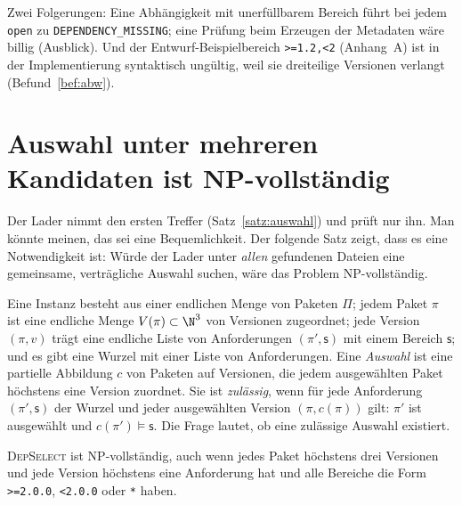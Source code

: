 Zwei Folgerungen: Eine Abhängigkeit mit unerfüllbarem Bereich führt bei jedem \texttt{open} zu \texttt{DEPENDENCY\_MISSING}; eine Prüfung beim Erzeugen der Metadaten wäre billig (Ausblick). Und der Entwurf-Beispielbereich \texttt{>=1.2,<2} (Anhang~A) ist in der Implementierung syntaktisch ungültig, weil sie dreiteilige Versionen verlangt (Befund~\ref{bef:abw}).

\section{Auswahl unter mehreren Kandidaten ist NP-vollständig}

Der Lader nimmt den ersten Treffer (Satz~\ref{satz:auswahl}) und prüft nur ihn. Man könnte meinen, das sei eine Bequemlichkeit. Der folgende Satz zeigt, dass es eine Notwendigkeit ist: Würde der Lader unter \emph{allen} gefundenen Dateien eine gemeinsame, verträgliche Auswahl suchen, wäre das Problem NP-vollständig.

\begin{definition}
	\label{def:depselect}
	Eine Instanz besteht aus einer endlichen Menge von Paketen $\Pi$; jedem Paket $\pi$ ist eine endliche Menge $V(\pi)\subset\N^3$ von Versionen zugeordnet; jede Version $(\pi,v)$ trägt eine endliche Liste von Anforderungen $(\pi',\mathsf{s})$ mit einem Bereich $\mathsf{s}$; und es gibt eine Wurzel mit einer Liste von Anforderungen. Eine \emph{Auswahl} ist eine partielle Abbildung $c$ von Paketen auf Versionen, die jedem ausgewählten Paket höchstens eine Version zuordnet. Sie ist \emph{zulässig}, wenn für jede Anforderung $(\pi',\mathsf{s})$ der Wurzel und jeder ausgewählten Version $(\pi,c(\pi))$ gilt: $\pi'$ ist ausgewählt und $c(\pi')\models\mathsf{s}$. Die Frage lautet, ob eine zulässige Auswahl existiert.
\end{definition}

\begin{satz}
	\label{satz:npvoll}
	\textsc{DepSelect} ist NP-vollständig, auch wenn jedes Paket höchstens drei Versionen und jede Version höchstens eine Anforderung hat und alle Bereiche die Form \texttt{>=2.0.0}, \texttt{<2.0.0} oder \texttt{*} haben.
\end{satz}

